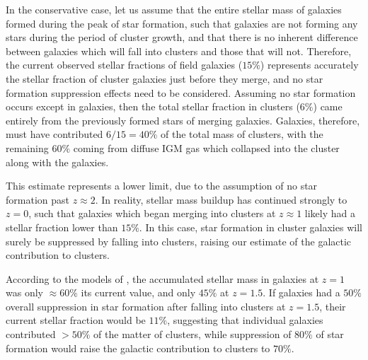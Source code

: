 In the conservative case, let us assume that the entire stellar mass
of galaxies formed during the peak of star formation, such that
galaxies are not forming any stars during the period of cluster
growth, and that there is no inherent difference between galaxies
which will fall into clusters and those that will not. Therefore, the
current observed stellar fractions of field galaxies ($15\%$)
represents accurately the stellar fraction of cluster galaxies just
before they merge, and no star formation suppression effects need to
be considered. Assuming no star formation occurs except in galaxies,
then the total stellar fraction in clusters ($6\%$) came entirely from
the previously formed stars of merging galaxies. Galaxies, therefore,
must have contributed $6/15 = 40\%$ of the total mass of clusters,
with the remaining $60\%$ coming from diffuse IGM gas which collapsed
into the cluster along with the galaxies. 

This estimate represents a lower limit, due to the assumption of no
star formation past $z\approx2$. In reality, stellar mass buildup has
continued strongly to $z=0$, such that galaxies which began merging
into clusters at $z\approx1$ likely had a stellar fraction lower than
$15\%$. In this case, star formation in cluster galaxies will surely
be suppressed by falling into clusters, raising our estimate of the
galactic contribution to clusters. 

According to the models of \citet{Hopkins2006}, the accumulated
stellar mass in galaxies at $z=1$ was only $\approx60\%$ its current
value, and only $45\%$ at $z=1.5$. If galaxies had a $50\%$ overall
suppression in star formation after falling into clusters at $z=1.5$,
their current stellar fraction would be $11\%$, suggesting that
individual galaxies contributed $>50\%$ of the matter of clusters,
while suppression of $80\%$ of star formation would raise the galactic
contribution to clusters to $70\%$. 

